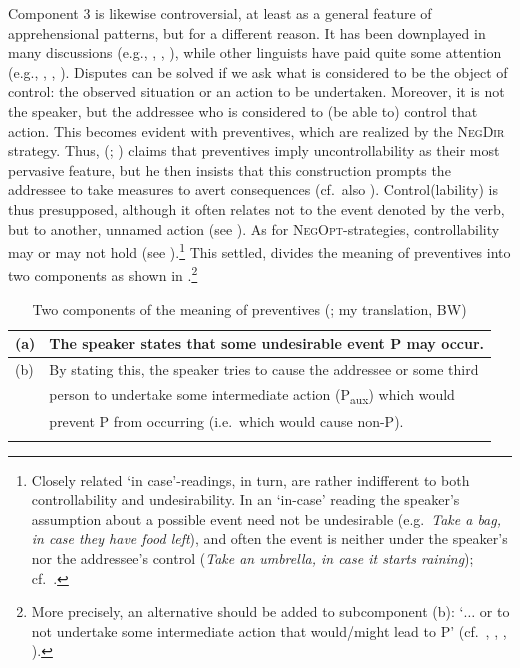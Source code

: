 \documentclass[output=paper,colorlinks,citecolor=brown]{langscibook}
\begin{document}
Component 3 is likewise controversial, at least as a general feature of apprehensional patterns, but for a different reason. It has been downplayed in many discussions (e.g., \citealt[297, 312--314]{lichtenberk1995}, \citealt[95, 98--100]{Nilsson2013}, \citealt[59f., but see p. 65]{MitkovskaEtAl2017}), while other linguists have paid quite some attention (e.g., \citealt[95--96, 103--105]{Holvoet1989}, \citealt[213--215]{Xrakovskij1990}, \citealt[35--36]{Luczkow1997}). Disputes can be solved if we ask what is considered to be the object of control: the observed situation or an action to be undertaken. Moreover, it is not the speaker, but the addressee who is considered to (be able to) control that action. This becomes evident with preventives, which are realized by the \textsc{NegDir} strategy. Thus, \citeauthor{Birjulin1992} (\citeyear[5, 7]{Birjulin1992}; \citeyear{Birjulin1994}) claims that preventives imply uncontrollability as their most pervasive feature, but he then insists that this construction prompts the addressee to take measures to avert consequences (cf.\ also \citealt[225]{Aikhenvald2010}). Control(lability) is thus presupposed, although it often relates not to the event denoted by the verb, but to another, unnamed action (see ). As for \textsc{NegOpt-}strategies, controllability may or may not hold (see ).\footnote{Closely related `in case'-readings, in turn, are rather indifferent to both controllability \citep[58]{Dobrushina2006wiemer} and undesirability. In an `in-case' reading the speaker's assumption about a possible event need not be undesirable (e.g.\ \textit{Take a bag, in case they have food left}), and often the event is neither under the speaker's nor the addressee's control (\textit{Take an umbrella, in case it starts raining}); cf.\ \citet[298--302, 311]{lichtenberk1995}.} This settled, \citet{Gusev2013} divides the meaning of preventives into two components as shown in .\footnote{More precisely, an alternative should be added to subcomponent (b): `$\ldots$ or to not undertake some intermediate action that would/might lead to P' (cf.\ \citealt{Birjulin1992,Birjulin1994}, \citeauthor{BirjulinXrakovskij1992} \citeyear[38]{BirjulinXrakovskij1992}, \citeyear[37--38]{BirjulinXrakovskij2001}, \citealt[30]{Dobrushina2006wiemer}).}

\begin{table}
\caption{Two components of the meaning of preventives (\citealt[61--62]{Gusev2013}{;} my translation, BW)}
\label{tab:twocomponents}
\begin{tabular}{ll}
\lsptoprule
(a) & The speaker states that some undesirable event P may occur.\\ 
\midrule
(b) & By stating this, the speaker tries to cause the addressee or some third \\
    & person to undertake some intermediate action (P\textsubscript{aux}) which would \\
    & prevent P from occurring (i.e.\ which would cause non-P). \\
 \lspbottomrule
\end{tabular}
\end{table}
\end{document}
